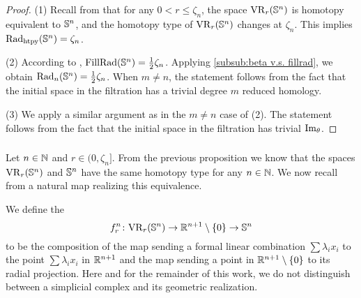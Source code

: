 \begin{proof}
	(1) Recall from \cite[Thm.~7.1]{lim2020vietoris} that for any $0 < r \leq \zeta_n$, the space $\mathrm{VR}_r(\mathbb{S}^n)$ is homotopy equivalent to $\mathbb{S}^n$, and the homotopy type of $\mathrm{VR}_r(\mathbb{S}^n)$ changes at $\zeta_n$.
	This implies $\mathrm{Rad}_{\mathrm{htpy}}(\mathbb{S}^n)=\zeta_n$.

	(2) According to \cite{katz1983filling}, \(\mathrm{FillRad}(\mathbb{S}^n) = \frac{1}{2}\zeta_n\).
	Applying \cref{subsub:beta v.s. fillrad}, we obtain \(\mathrm{Rad}_{n}(\mathbb{S}^n) = \frac{1}{2}\zeta_n\).
    When $m\neq n$, the statement follows from the fact that the initial space in the filtration has a trivial degree $m$ reduced homology.

	(3) We apply a similar argument as in the $m\neq n$ case of (2). The statement follows from the fact that the initial space in the filtration has trivial $\operatorname{Im}_\theta$.
\end{proof}

\subsubsection{}\label{ss:VRSn projection}

Let \(n \in \mathbb{N}\) and \(r \in (0, \zeta_n]\).
From the previous proposition we know that the spaces \(\mathrm{VR}_r(\mathbb{S}^n)\) and \(\mathbb{S}^n\) have the same homotopy type for any \(n \in \mathbb{N}\).
We now recall from \cite{adamaszek2020homotopy} a natural map realizing this equivalence.

We define the 
\[
f_r^n \colon \mathrm{VR}_r(\mathbb{S}^n) \to \mathbb{R}^{n+1} \setminus \{0\} \to \mathbb{S}^n
\]
to be the composition of the map sending a formal linear combination $\sum\lambda_i x_i$ to the point \(\sum\lambda_i x_i\) in \(\mathbb{R}^{n+1}\) and the map sending a point in \(\mathbb{R}^{n+1} \setminus \{0\}\) to its radial projection.
Here and for the remainder of this work, we do not distinguish between a simplicial complex and its geometric realization.


